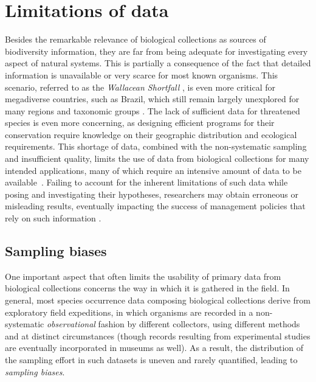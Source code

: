\section{Limitations of data} 
\label{section:limitdata}



Besides the remarkable relevance of biological collections as sources of biodiversity information, they are far from being adequate for investigating every aspect of natural systems.
This is partially a consequence of the fact that detailed information is unavailable or very scarce for most known organisms.
This scenario, referred to as the \textit{Wallacean Shortfall} \cite{Lomolino2004}, is even more critical for megadiverse countries, such as Brazil, which still remain largely unexplored for many regions and taxonomic groups \cite{Soberon2004}.
The lack of sufficient data for threatened species is even more concerning, as designing efficient programs for their conservation require knowledge on their geographic distribution and ecological requirements.
This shortage of data, combined with the non-systematic sampling and insufficient quality, limits the use of data from biological collections for many intended applications, many of which require an intensive amount of data to be available~\cite{Guisan2007}.
Failing to account for the inherent limitations of such data while posing and investigating their hypotheses, researchers may obtain erroneous or misleading results, eventually impacting the success of management policies that rely on such information \cite{Chapman2005}.


\subsection{Sampling biases}
One important aspect that often limits the usability of primary data from biological collections concerns the way in which it is gathered in the field.
In general, most species occurrence data composing biological collections derive from exploratory field expeditions, in which organisms are recorded in a non-systematic \textit{observational} fashion by different collectors, using different methods and at distinct circumstances (though records resulting from experimental studies are eventually incorporated in museums as well). 
As a result, the distribution of the sampling effort in such datasets is uneven and rarely quantified, leading to \textit{sampling biases}.

